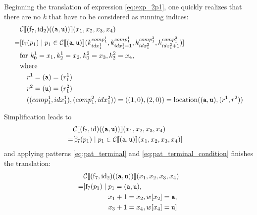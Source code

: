 \documentclass[
    a4paper,
    12pt,
    twoside,
    BCOR=12mm,
    parskip=half,
    chapterprefix,
    numbers=noenddot,
    bibliography=totoc
]{scrbook}
\begin{document}
Beginning the translation of expression \ref{eq:exp_2p1}, one quickly realizes that there are no $k$ that have to be considered as running indices:
\begin{align*}
    &\mathcal{C} \llbracket (\op{f}_7,\op{id}_2)((\ts{a},\ts{u})) \rrbracket (x_1,x_2,x_3,x_4) \\
  = &\!\begin{aligned}[t]
    [ \op{f}_7(p_1) \mid \; &p_1 \in \mathcal{C}\llbracket (\ts{a},\ts{u}) \rrbracket (k^{comp^1_1}_{idx^1_1},k^{comp^1_1}_{idx^1_1 + 1},k^{comp^2_1}_{idx^2_1},k^{comp^2_1}_{idx^2_1 + 1})
    ]
    \end{aligned} \\
    &\text{for } k^1_0 = x_1, k^1_2 = x_2, k^2_0 = x_3, k^2_2 = x_4,\\
    &\text{where}\\
    &\quad r^1 = (\ts{a}) = (r^1_1)\\
    &\quad r^2 = (\ts{u}) = (r^2_1)\\
    &\quad ((comp^1_1, idx^1_1),(comp^2_1, idx^2_1))=((1,0),(2,0))=\op{location}((\ts{a},\ts{u}),(r^1,r^2))
\end{align*}

Simplification leads to	
\begin{align*}
    &\mathcal{C} \llbracket (\op{f}_7,\op{id})((\ts{a},\ts{u})) \rrbracket (x_1,x_2,x_3,x_4) \\
  = &\!\begin{aligned}[t]
    [ \op{f}_7(p_1) \mid \; &p_1 \in \mathcal{C}\llbracket (\ts{a},\ts{u}) \rrbracket (x_1,x_2,x_3,x_4)
    ]
    \end{aligned}
\end{align*}
and applying patterns \ref{eq:pat_terminal} and \ref{eq:pat_terminal_condition} finishes the translation:
\begin{align*}
    &\mathcal{C} \llbracket (\op{f}_7,\op{id}_2)((\ts{a},\ts{u})) \rrbracket (x_1,x_2,x_3,x_4) \\
  = &\!\begin{aligned}[t]
    [ \op{f}_7(p_1) \mid \; &p_1 = (\ts{a},\ts{u}),\\
    & x_1+1 = x_2, w[x_2] = \ts{a},\\
    & x_3+1 = x_4, w[x_4] = \ts{u}
    ]
    \end{aligned}
\end{align*}
\end{document}
